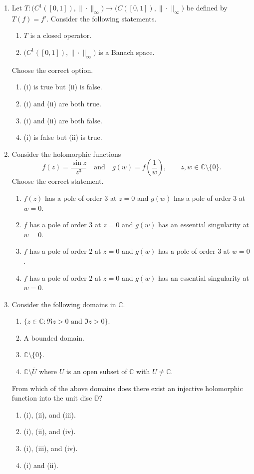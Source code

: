 \documentclass[11pt, a4paper]{article}
\begin{document}
\begin{enumerate}
\item Let $T:\bigl(C^1([0,1]),\|\cdot\|_\infty\bigr)\to\bigl(C([0,1]),\|\cdot\|_\infty\bigr)$ be defined by $T(f)=f'$. Consider the following statements.
\begin{enumerate}[label=(\roman*)]
\item $T$ is a closed operator.
\item $\bigl(C^1([0,1]),\|\cdot\|_\infty\bigr)$ is a Banach space.
\end{enumerate}
Choose the correct option.
\begin{enumerate}[label=(\alph*)]
\item (i) is true but (ii) is false.
\item (i) and (ii) are both true.
\item (i) and (ii) are both false.
\item (i) is false but (ii) is true.
\end{enumerate}

\item Consider the holomorphic functions
\[ f(z)=\frac{\sin z}{z^3}\quad\text{and}\quad g(w)=f\!\left(\frac1w\right),\qquad z,w\in\mathbb{C}\setminus\{0\}. \]
Choose the correct statement.
\begin{enumerate}[label=(\alph*)]
\item $f(z)$ has a pole of order $3$ at $z=0$ and $g(w)$ has a pole of order $3$ at $w=0$.
\item $f$ has a pole of order $3$ at $z=0$ and $g(w)$ has an essential singularity at $w=0$.
\item $f$ has a pole of order $2$ at $z=0$ and $g(w)$ has a pole of order $3$ at $w=0$.
\item $f$ has a pole of order $2$ at $z=0$ and $g(w)$ has an essential singularity at $w=0$.
\end{enumerate}

\item Consider the following domains in $\mathbb{C}$.
\begin{enumerate}[label=(\roman*)]
\item $\{z\in\mathbb{C}:\Re z>0\text{ and }\Im z>0\}$.
\item A bounded domain.
\item $\mathbb{C}\setminus\{0\}$.
\item $\mathbb{C}\setminus\overline{U}$ where $U$ is an open subset of $\mathbb{C}$ with $U\neq\mathbb{C}$.
\end{enumerate}
From which of the above domains does there exist an injective holomorphic function into the unit disc $\mathbb{D}$?
\begin{enumerate}[label=(\alph*)]
\item (i), (ii), and (iii).
\item (i), (ii), and (iv).
\item (i), (iii), and (iv).
\item (i) and (ii).
\end{enumerate}


\end{enumerate}
\end{document}
